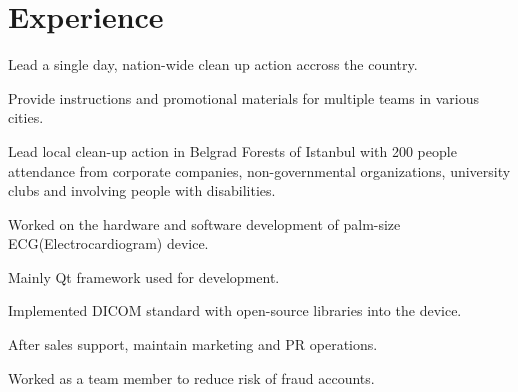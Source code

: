 \documentclass[]{deedy-resume-openfont}
\begin{document}
\hfill
\begin{minipage}[t]{0.66\textwidth} 


\section{Experience}

\href{http://letsdoitturkiye.org.tr/}{}
\vspace{\topsep} %
\begin{tightemize}
\item Lead a single day, nation-wide clean up action accross the country.
\item Provide instructions and promotional materials for multiple teams in various cities.
\item Lead local clean-up action in Belgrad Forests of Istanbul with 200 people attendance from corporate companies, non-governmental organizations, university clubs and involving people with disabilities.
\end{tightemize}
\sectionsep

\href{http://infron.com.tr/}{}
\begin{tightemize}
\item Worked on the hardware and software development of palm-size ECG(Electrocardiogram) device.
\item Mainly Qt framework used for development.
\item Implemented DICOM standard with open-source libraries into the device.
\item After sales support, maintain marketing and PR operations.
\end{tightemize}
\sectionsep

\href{http://www.anadolusigorta.com.tr/}{}
\begin{tightemize}
\item Worked as a team member to reduce risk of fraud accounts.
\end{tightemize}
\sectionsep


\end{minipage}
\end{document}
